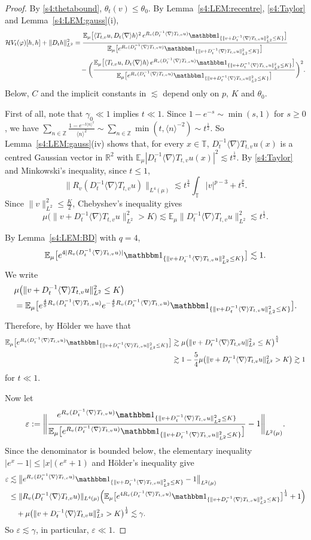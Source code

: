 \documentclass[10pt,a4paper]{amsart}
\theoremstyle{plain}
\theoremstyle{definition}
\theoremstyle{remark}
\newcommand{\noi}{\noindent}
\newcommand{\Z}{\mathbb{Z}}
\newcommand{\R}{\mathbb{R}}
\newcommand{\T}{\mathbb{T}}
\renewcommand{\H}{\mathcal H}
\newcommand{\E}{\mathbb{E}}
\newcommand{\nb}{\nabla}
\newcommand{\ep}{\varepsilon}
\newcommand{\g}{\gamma}
\newcommand{\les}{\lesssim}
\newcommand{\jb}[1]
{\langle #1 \rangle}
\newcommand{\ind}{\mathbbm 1}
\newcommand{\ph}{\varphi}
\newcommand{\eps}{\ep}
\newcommand{\RT}{R_v(D_t^{-1}\jb\nb T_{t,v}u)}
\newcommand{\IT}{\ind_{\{\|v+D_t^{-1}\jb\nb T_{t,v}u\|_{L^2}^2\le K\}}}
\begin{document}
\begin{proof}
By \eqref{s4:thetabound}, $\theta_t(v)\le\theta_0$. By Lemma~\ref{s4:LEM:recentre}, \eqref{s4:Taylor} and
Lemma~\ref{s4:LEM:gauss}(i),
\begin{equation}\label{s4:Hessratio}
\begin{aligned}
\H V_t(\ph)[h,h]+\|D_th\|_{L^2}^2
&=\frac{\E_\mu\big[\jb{T_{t,v}u,D_t\jb\nb h}^2\,e^{\RT}\IT\big]}{\E_\mu\big[e^{\RT}\IT\big]}\\
&\quad-\bigg(\frac{\E_\mu\big[\jb{T_{t,v}u,D_t\jb\nb h}\,e^{\RT}\IT\big]}{\E_\mu\big[e^{\RT}\IT\big]}\bigg)^2 .
\end{aligned}
\end{equation}
Below, $C$ and the implicit constants in $\les$ depend only on $p$, $K$ and $\theta_0$.

First of all, note that $\g_0 \ll 1$ implies $t \ll 1$.
Since $1-e^{-s}\sim\min(s,1)$ for $s\ge0$, we have
$\sum_{n\in\Z}\frac{1-e^{-t\jb n^2}}{\jb n^2}\sim\sum_{n\in\Z}\min(t,\jb n^{-2})\sim t^{\frac12}$.
So Lemma~\ref{s4:LEM:gauss}(iv) shows that, for every $x\in\T$, $D_t^{-1}\jb\nb T_{t,v}u(x)$ is a centred Gaussian
vector in $\R^2$ with $\E_\mu|D_t^{-1}\jb\nb T_{t,v}u(x)|^2\les t^\frac12$. By \eqref{s4:Taylor} and Minkowski's
inequality, since $t\le1$,
\[
\|\RT\|_{L^4(\mu)}\les t^{\frac34}\int_\T|v|^{p-3}+t^{\frac p4}.
\]
Since $\|v\|_{L^2}^2\le\frac K2$, Chebyshev's inequality gives
\[
\mu\big(\|v+D_t^{-1}\jb\nb T_{t,v}u\|_{L^2}^2>K\big)\les\E_\mu\|D_t^{-1}\jb\nb T_{t,v}u\|_{L^2}^2\les t^\frac12 .
\]

\noi
 By Lemma~\ref{s4:LEM:BD} with $q=4$,
\[
\E_\mu\big[e^{4|\RT|}\IT\big]\les1 .
\]
We write
\begin{align*}
&\mu\big(\|v+D_t^{-1}\jb\nb T_{t,v}u\|_{L^2}^2\le K\big) \\
&= \E_\mu\big[e^{\frac45\RT} e^{-\frac45\RT}\IT\big].
\end{align*}
Therefore, by H\"older we have that
\begin{align*}
\E_\mu\big[e^{\RT}\IT\big]& \gtrsim \mu\big(\|v+D_t^{-1}\jb\nb T_{t,v}u\|_{L^2}^2\le K\big)^\frac54\\
&\gtrsim 1 - \frac 54 \mu\big(\|v+D_t^{-1}\jb\nb T_{t,v}u\|_{L^2}^2>K\big) \gtrsim 1
\end{align*}
for $t \ll 1$.

Now let
\[
\eps:=\bigg\|\frac{e^{\RT}\IT}{\E_\mu\big[e^{\RT}\IT\big]}-1\bigg\|_{L^2(\mu)} .
\]
Since the denominator is bounded below,  the elementary inequality $|e^x-1|\le|x|(e^x+1)$ and H\"older's inequality give
\[
\begin{aligned}
\eps&\les\big\|e^{\RT}\IT-1\big\|_{L^2(\mu)}\\
&\le\|\RT\|_{L^4(\mu)}\Big(\E_\mu\big[e^{4\RT}\IT\big]^{\frac14}+1\Big)\\
&\quad+\mu\big(\|v+D_t^{-1}\jb\nb T_{t,v}u\|_{L^2}^2>K\big)^{\frac12}\les\gamma .
\end{aligned}
\]
So $\eps\les\gamma$, in particular, $\eps\ll 1$.


\end{proof}
\end{document}

